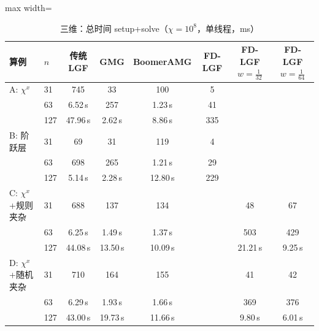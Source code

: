\begin{table}[H]\centering\small
\caption{三维：总时间 setup+solve（$\chi=10^8$，单线程，ms）}\label{tab:time3d}
\begin{adjustbox}{max width=\textwidth}
\begin{tabular}{llcccccc}
\toprule
算例 & $n$ & 传统 LGF & GMG & BoomerAMG & FD-LGF & FD-LGF $w{=}\frac1{32}$ & FD-LGF $w{=}\frac1{64}$ \\
\midrule
A: $\chi^x$ & 31 & 745 & 33 & 100 & 5 &  &  \\
 & 63 & 6.52\,s & 257 & 1.23\,s & 41 &  &  \\
 & 127 & 47.96\,s & 2.62\,s & 8.86\,s & 335 &  &  \\
\midrule
B: 阶跃层 & 31 & 69 & 31 & 119 & 4 &  &  \\
 & 63 & 698 & 265 & 1.21\,s & 29 &  &  \\
 & 127 & 5.14\,s & 2.28\,s & 12.80\,s & 229 &  &  \\
\midrule
C: $\chi^x$+规则夹杂 & 31 & 688 & 137 & 134 &  & 48 & 67 \\
 & 63 & 6.25\,s & 1.49\,s & 1.37\,s &  & 503 & 429 \\
 & 127 & 44.08\,s & 13.50\,s & 10.09\,s &  & 21.21\,s & 9.25\,s \\
\midrule
D: $\chi^x$+随机夹杂 & 31 & 710 & 164 & 155 &  & 41 & 42 \\
 & 63 & 6.29\,s & 1.93\,s & 1.66\,s &  & 369 & 376 \\
 & 127 & 43.00\,s & 19.73\,s & 11.66\,s &  & 9.80\,s & 6.01\,s \\
\bottomrule
\end{tabular}
\end{adjustbox}
\end{table}

